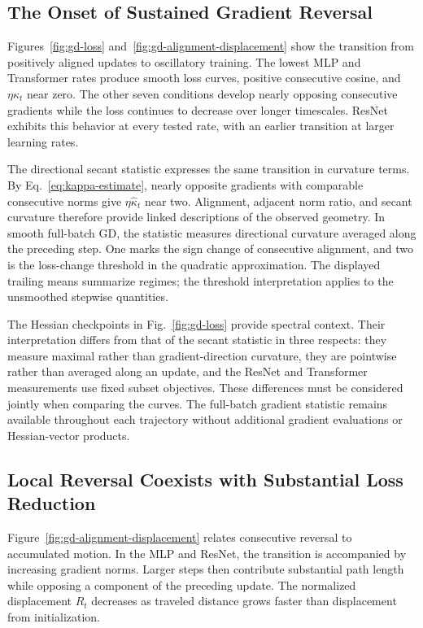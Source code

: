 \subsection{The Onset of Sustained Gradient Reversal}

Figures~\ref{fig:gd-loss} and~\ref{fig:gd-alignment-displacement} show the
transition from positively aligned updates to oscillatory training.
The lowest MLP and Transformer rates produce smooth loss curves,
positive consecutive cosine, and $\eta\widehat\kappa_t$ near zero.
The other seven conditions develop nearly opposing consecutive gradients
while the loss continues to decrease over longer timescales.
ResNet exhibits this behavior at every tested rate, with an earlier
transition at larger learning rates.

The directional secant statistic expresses the same transition in
curvature terms. By Eq.~\eqref{eq:kappa-estimate}, nearly opposite gradients
with comparable consecutive norms give $\eta\widehat\kappa_t$ near two.
Alignment, adjacent norm ratio, and secant curvature therefore provide
linked descriptions of the observed geometry. In smooth full-batch GD,
the statistic measures directional curvature averaged along the preceding
step. One marks the sign change of consecutive alignment, and two is the
loss-change threshold in the quadratic approximation. The displayed
trailing means summarize regimes; the threshold interpretation applies
to the unsmoothed stepwise quantities.

The Hessian checkpoints in Fig.~\ref{fig:gd-loss} provide spectral context.
Their interpretation differs from that of the secant statistic in three
respects: they measure maximal rather than gradient-direction curvature,
they are pointwise rather than averaged along an update, and the ResNet
and Transformer measurements use fixed subset objectives. These differences
must be considered jointly when comparing the curves. The full-batch
gradient statistic remains available throughout each trajectory without
additional gradient evaluations or Hessian-vector products.

\subsection{Local Reversal Coexists with Substantial Loss Reduction}

Figure~\ref{fig:gd-alignment-displacement} relates consecutive reversal
to accumulated motion. In the MLP and ResNet, the transition is accompanied
by increasing gradient norms. Larger steps then contribute substantial
path length while opposing a component of the preceding update.
The normalized displacement $R_t$ decreases as traveled distance grows
faster than displacement from initialization.

